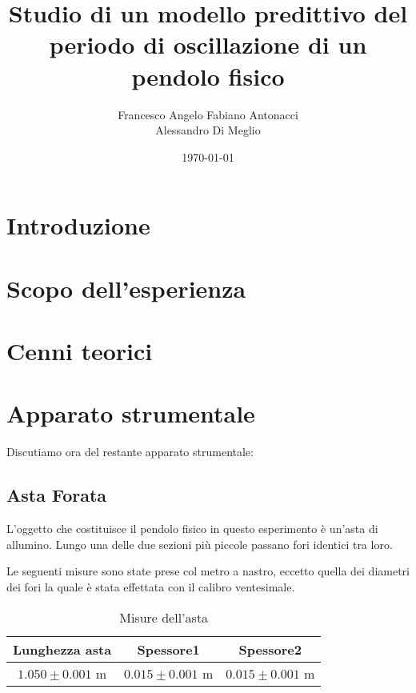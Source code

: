 \documentclass[11pt]{article}
\title{Studio di un modello predittivo del periodo di oscillazione di un pendolo fisico}
\author{Francesco Angelo Fabiano Antonacci\\Alessandro Di Meglio}
\date{\today}
\begin{document}
\maketitle

\section{Introduzione}

\section{Scopo dell'esperienza}

\section{Cenni teorici}

\section{Apparato strumentale}

Discutiamo ora del restante apparato strumentale:
\subsection{Asta Forata}
L'oggetto che costituisce il pendolo fisico in questo esperimento è un'asta di allumino.
Lungo  una delle due sezioni più piccole passano fori identici  tra loro.

Le seguenti misure sono state prese col metro a nastro, eccetto quella dei diametri dei fori la quale è  stata effettata con il calibro ventesimale.

\begin{table}
\centering

\caption{Misure dell'asta}
\begin{tabular}[t]{|c|c|c|}
 Lunghezza asta &Spessore1&Spessore2\\
  \hline
  $1.050 \pm 0.001$ m & $0.015 \pm 0.001$ m & $0.015 \pm 0.001$ m \\
\end{tabular}

\end{table}
\end{document}
